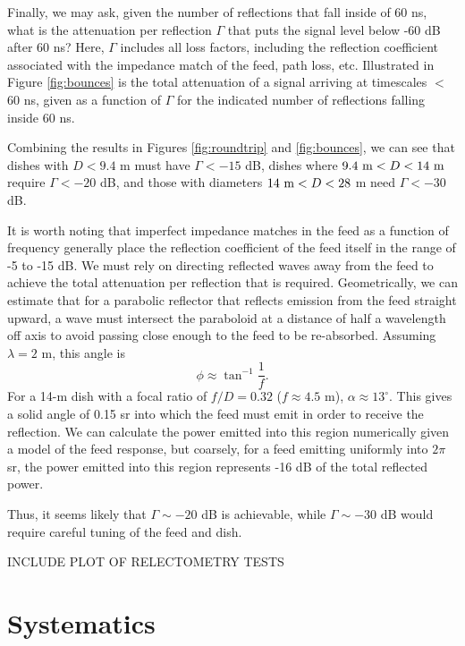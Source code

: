 \documentclass[11pt]{article}
\begin{document}
Finally, we may ask, given the number of reflections that fall inside of 60 ns,
what is the attenuation per reflection $\Gamma$ that puts the signal level below
-60 dB after 60 ns?  Here, $\Gamma$ includes all loss factors, including the 
reflection coefficient associated with the impedance match of the feed,
path loss, etc.  Illustrated in Figure \ref{fig:bounces} is the total attenuation 
of a signal arriving at timescales $<$60 ns,
given as a function of $\Gamma$ for the indicated number of reflections falling
inside 60 ns.

Combining the results in Figures \ref{fig:roundtrip} and \ref{fig:bounces},
we can see that dishes with $D<9.4$ m must have $\Gamma<-15$ dB, dishes
where $9.4~{\rm m}<D<14~{\rm m}$ require $\Gamma<-20$ dB, and those with
diameters $14~{\rm m}<D<28$ m need $\Gamma<-30$ dB.

It is worth noting that imperfect impedance matches in the feed as a function
of frequency generally place the reflection coefficient of the feed itself
in the range of -5 to -15 dB. We must rely on directing reflected
waves away from the feed to achieve the total attenuation per reflection
that is required.  Geometrically, we can estimate that for a parabolic reflector that
reflects emission from the feed straight upward, a wave must intersect the paraboloid
at a distance of half a wavelength off axis to avoid
passing close enough to the feed to be re-absorbed.  Assuming $\lambda=2$ m, this angle is 
\begin{equation}
\phi\approx\tan^{-1}\frac{1}{f}.
\end{equation}
For a 14-m dish with a focal ratio of $f/D=0.32$ ($f\approx4.5$ m), $\alpha\approx13^\circ$.
This gives a solid angle of 0.15 sr into which the feed must emit in order to receive the reflection.
We can calculate the power emitted into this region numerically given a model of the feed response,
but coarsely, for a feed emitting uniformly into $2\pi$ sr, the power emitted into this region
represents -16 dB of the total reflected power.  

Thus, it seems likely that $\Gamma\sim-20$ dB is achievable, while $\Gamma\sim-30$ dB
would require careful tuning of the feed and dish.

INCLUDE PLOT OF RELECTOMETRY TESTS

\section{Systematics}
\end{document}
